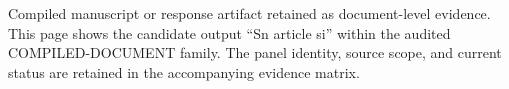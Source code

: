 Compiled manuscript or response artifact retained as document-level evidence. This page shows the candidate output ``Sn article si'' within the audited COMPILED-DOCUMENT family. The panel identity, source scope, and current status are retained in the accompanying evidence matrix.
